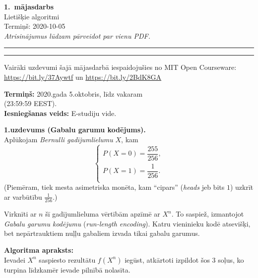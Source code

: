 \documentclass[a4paper,12pt]{article}
\begin{document}
\begin{center}
{\bf\Huge 1.\ mājasdarbs} \\[5pt]
Lietišķie algoritmi \\
Termiņš: 2020-10-05\\[5pt]
{\em Atrisinājumus lūdzam pārveidot par vienu PDF.}
\end{center}

\hrule
\vspace{2pt}
\hrule
\vspace{12pt}



{\footnotesize
Vairāki uzdevumi šajā mājasdarbā iespaidojušies no MIT Open Courseware:
\url{https://bit.ly/37Aywtf} un \url{https://bit.ly/2BdK8GA}\\
}

{\bf Termiņš:} 2020.gada 5.oktobris, līdz vakaram\\ (23:59:59 EEST).\\
{\bf Iesniegšanas veids:} E-studiju vide.

\vspace{10pt}
{\bf 1.uzdevums (Gabalu garumu kodējums).}\\
Aplūkojam {\em Bernulli gadījumlielumu} $X$, kam
$$\left\{
\begin{array}{l}
P(X = 0) = \dfrac{255}{256},\\[6pt]
P(X = 1) = \dfrac{1}{256}.\\
\end{array} \right.$$
(Piemēram, tiek mesta asi\-met\-ris\-ka monēta, kam ``cipars''
({\em heads} jeb bits $1$) uzkrīt ar varbūtību $\frac{1}{256}$.)

Virknīti ar $n$ šī gadījumlieluma vērtībām ap\-zī\-mē ar $X^n$.
To saspiež, izmantojot {\em Gabalu garumu ko\-dē\-ju\-mu} ({\em run-length encoding}).
Katru vieninieku kodē atsevišķi, bet
nepārtrauktiem nuļļu gabaliem izvada tikai gabalu garumus.

{\bf Algoritma apraksts:}\\
Ievadei $X^n$ saspiesto rezultātu $f(X^n)$ iegūst,
atkārtoti izpildot šos 3 soļus, ko turpina līdzkamēr
ievade pilnībā nolasīta.
\end{document}
